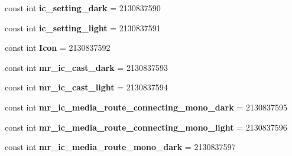 \begin{DoxyCompactItemize}
\item 
\hypertarget{classClient_1_1Droid_1_1Resource_1_1Drawable_a0c899a91b653bacc5d663cc316f01a9b}{}const int {\bfseries ic\+\_\+setting\+\_\+dark} = 2130837590\label{classClient_1_1Droid_1_1Resource_1_1Drawable_a0c899a91b653bacc5d663cc316f01a9b}

\item 
\hypertarget{classClient_1_1Droid_1_1Resource_1_1Drawable_a3a6427e9c2bb595218856cf27b1e79d4}{}const int {\bfseries ic\+\_\+setting\+\_\+light} = 2130837591\label{classClient_1_1Droid_1_1Resource_1_1Drawable_a3a6427e9c2bb595218856cf27b1e79d4}

\item 
\hypertarget{classClient_1_1Droid_1_1Resource_1_1Drawable_a93a05a99dc25da8cb90c1c229e83891f}{}const int {\bfseries Icon} = 2130837592\label{classClient_1_1Droid_1_1Resource_1_1Drawable_a93a05a99dc25da8cb90c1c229e83891f}

\item 
\hypertarget{classClient_1_1Droid_1_1Resource_1_1Drawable_aab7729fe07d1cc9bf188f13636d01fb6}{}const int {\bfseries mr\+\_\+ic\+\_\+cast\+\_\+dark} = 2130837593\label{classClient_1_1Droid_1_1Resource_1_1Drawable_aab7729fe07d1cc9bf188f13636d01fb6}

\item 
\hypertarget{classClient_1_1Droid_1_1Resource_1_1Drawable_a0804f5c59b59c4f2593a95a85e398da2}{}const int {\bfseries mr\+\_\+ic\+\_\+cast\+\_\+light} = 2130837594\label{classClient_1_1Droid_1_1Resource_1_1Drawable_a0804f5c59b59c4f2593a95a85e398da2}

\item 
\hypertarget{classClient_1_1Droid_1_1Resource_1_1Drawable_a680ea143f6d95b5473750c30fef4cde8}{}const int {\bfseries mr\+\_\+ic\+\_\+media\+\_\+route\+\_\+connecting\+\_\+mono\+\_\+dark} = 2130837595\label{classClient_1_1Droid_1_1Resource_1_1Drawable_a680ea143f6d95b5473750c30fef4cde8}

\item 
\hypertarget{classClient_1_1Droid_1_1Resource_1_1Drawable_afb9f2c4627d39f3a876f6ba320d619f2}{}const int {\bfseries mr\+\_\+ic\+\_\+media\+\_\+route\+\_\+connecting\+\_\+mono\+\_\+light} = 2130837596\label{classClient_1_1Droid_1_1Resource_1_1Drawable_afb9f2c4627d39f3a876f6ba320d619f2}

\item 
\hypertarget{classClient_1_1Droid_1_1Resource_1_1Drawable_a10c3973419d5aa1945e1979cc2b0a3e8}{}const int {\bfseries mr\+\_\+ic\+\_\+media\+\_\+route\+\_\+mono\+\_\+dark} = 2130837597\label{classClient_1_1Droid_1_1Resource_1_1Drawable_a10c3973419d5aa1945e1979cc2b0a3e8}


\end{DoxyCompactItemize}
